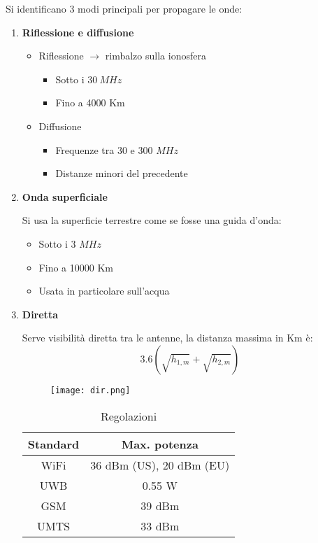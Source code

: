 \documentclass{article}
\begin{document}
\noindent Si identificano 3 modi principali per propagare le onde:
\begin{enumerate}
    \item \textbf{Riflessione e diffusione}
        \begin{itemize}
            \item Riflessione $\rightarrow$ rimbalzo sulla ionosfera
                \begin{itemize}
                    \item Sotto i $30\ MHz$
                    \item Fino a 4000 Km
                \end{itemize}
            \item Diffusione
                \begin{itemize}
                    \item Frequenze tra 30 e 300 $MHz$
                    \item Distanze minori del precedente
                \end{itemize}
        \end{itemize}
    \item \textbf{Onda superficiale}

        Si usa la superficie terrestre come se fosse una guida d'onda:
            \begin{itemize}
                \item Sotto i 3 $MHz$
                \item Fino a 10000 Km
                \item Usata in particolare sull'acqua
            \end{itemize}
    
    \item \textbf{Diretta}

        Serve visibilità diretta tra le antenne, la distanza massima in Km è:
        $$3.6(\sqrt{h_{1,m}}+\sqrt{h_{2,m}})$$

        \begin{figure}[ht]
            \centering
            \texttt{[image: dir.png]}
        \end{figure}

        \begin{table}[ht]
            \centering
            \begin{tabular}{c|c}
                Standard & Max. potenza\\
                 \hline
                WiFi & 36 dBm (US), 20 dBm (EU)\\
                 \hline
                UWB & 0.55 W\\
                 \hline
                GSM & 39 dBm\\
                 \hline
                UMTS & 33 dBm \\
            \end{tabular}
            \caption{Regolazioni}
        \end{table}


\end{enumerate}
\end{document}
